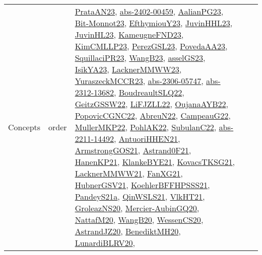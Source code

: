 {\begin{longtable}{llp{6cm}p{6cm}p{6cm}}
Concepts & order & \href{articles/PrataAN23.pdf}{PrataAN23}\cite{PrataAN23}, \href{articles/abs-2402-00459.pdf}{abs-2402-00459}\cite{abs-2402-00459}, \href{papers/AalianPG23.pdf}{AalianPG23}\cite{AalianPG23}, \href{papers/Bit-Monnot23.pdf}{Bit-Monnot23}\cite{Bit-Monnot23}, \href{papers/EfthymiouY23.pdf}{EfthymiouY23}\cite{EfthymiouY23}, \href{papers/JuvinHHL23.pdf}{JuvinHHL23}\cite{JuvinHHL23}, \href{papers/JuvinHL23.pdf}{JuvinHL23}\cite{JuvinHL23}, \href{papers/KameugneFND23.pdf}{KameugneFND23}\cite{KameugneFND23}, \href{papers/KimCMLLP23.pdf}{KimCMLLP23}\cite{KimCMLLP23}, \href{papers/PerezGSL23.pdf}{PerezGSL23}\cite{PerezGSL23}, \href{papers/PovedaAA23.pdf}{PovedaAA23}\cite{PovedaAA23}, \href{papers/SquillaciPR23.pdf}{SquillaciPR23}\cite{SquillaciPR23}, \href{papers/WangB23.pdf}{WangB23}\cite{WangB23}, \href{papers/asselGS23.pdf}{asselGS23}\cite{asselGS23}, \href{articles/IsikYA23.pdf}{IsikYA23}\cite{IsikYA23}, \href{articles/LacknerMMWW23.pdf}{LacknerMMWW23}\cite{LacknerMMWW23}, \href{articles/YuraszeckMCCR23.pdf}{YuraszeckMCCR23}\cite{YuraszeckMCCR23}, \href{articles/abs-2306-05747.pdf}{abs-2306-05747}\cite{abs-2306-05747}, \href{articles/abs-2312-13682.pdf}{abs-2312-13682}\cite{abs-2312-13682}, \href{papers/BoudreaultSLQ22.pdf}{BoudreaultSLQ22}\cite{BoudreaultSLQ22}, \href{papers/GeitzGSSW22.pdf}{GeitzGSSW22}\cite{GeitzGSSW22}, \href{papers/LiFJZLL22.pdf}{LiFJZLL22}\cite{LiFJZLL22}, \href{papers/OujanaAYB22.pdf}{OujanaAYB22}\cite{OujanaAYB22}, \href{papers/PopovicCGNC22.pdf}{PopovicCGNC22}\cite{PopovicCGNC22}, \href{articles/AbreuN22.pdf}{AbreuN22}\cite{AbreuN22}, \href{articles/CampeauG22.pdf}{CampeauG22}\cite{CampeauG22}, \href{articles/MullerMKP22.pdf}{MullerMKP22}\cite{MullerMKP22}, \href{articles/PohlAK22.pdf}{PohlAK22}\cite{PohlAK22}, \href{articles/SubulanC22.pdf}{SubulanC22}\cite{SubulanC22}, \href{articles/abs-2211-14492.pdf}{abs-2211-14492}\cite{abs-2211-14492}, \href{papers/AntuoriHHEN21.pdf}{AntuoriHHEN21}\cite{AntuoriHHEN21}, \href{papers/ArmstrongGOS21.pdf}{ArmstrongGOS21}\cite{ArmstrongGOS21}, \href{papers/Astrand0F21.pdf}{Astrand0F21}\cite{Astrand0F21}, \href{papers/HanenKP21.pdf}{HanenKP21}\cite{HanenKP21}, \href{papers/KlankeBYE21.pdf}{KlankeBYE21}\cite{KlankeBYE21}, \href{papers/KovacsTKSG21.pdf}{KovacsTKSG21}\cite{KovacsTKSG21}, \href{papers/LacknerMMWW21.pdf}{LacknerMMWW21}\cite{LacknerMMWW21}, \href{articles/FanXG21.pdf}{FanXG21}\cite{FanXG21}, \href{articles/HubnerGSV21.pdf}{HubnerGSV21}\cite{HubnerGSV21}, \href{articles/KoehlerBFFHPSSS21.pdf}{KoehlerBFFHPSSS21}\cite{KoehlerBFFHPSSS21}, \href{articles/PandeyS21a.pdf}{PandeyS21a}\cite{PandeyS21a}, \href{articles/QinWSLS21.pdf}{QinWSLS21}\cite{QinWSLS21}, \href{articles/VlkHT21.pdf}{VlkHT21}\cite{VlkHT21}, \href{papers/GroleazNS20.pdf}{GroleazNS20}\cite{GroleazNS20}, \href{papers/Mercier-AubinGQ20.pdf}{Mercier-AubinGQ20}\cite{Mercier-AubinGQ20}, \href{papers/NattafM20.pdf}{NattafM20}\cite{NattafM20}, \href{papers/WangB20.pdf}{WangB20}\cite{WangB20}, \href{papers/WessenCS20.pdf}{WessenCS20}\cite{WessenCS20}, \href{articles/AstrandJZ20.pdf}{AstrandJZ20}\cite{AstrandJZ20}, \href{articles/BenediktMH20.pdf}{BenediktMH20}\cite{BenediktMH20}, \href{articles/LunardiBLRV20.pdf}{LunardiBLRV20}\cite{LunardiBLRV20}, 
\end{longtable}}
